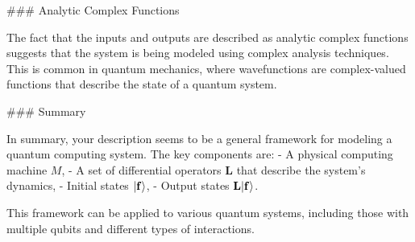 ### Analytic Complex Functions

The fact that the inputs and outputs are described as analytic complex functions suggests that the system is being modeled using complex analysis techniques. This is common in quantum mechanics, where wavefunctions are complex-valued functions that describe the state of a quantum system.

### Summary

In summary, your description seems to be a general framework for modeling a quantum computing system. The key components are:
- A physical computing machine \( M \),
- A set of differential operators \( \mathbf{L} \) that describe the system's dynamics,
- Initial states \( |{\bf f}\rangle \),
- Output states \( \mathbf{L}|{\bf f}\rangle \).

This framework can be applied to various quantum systems, including those with multiple qubits and different types of interactions.